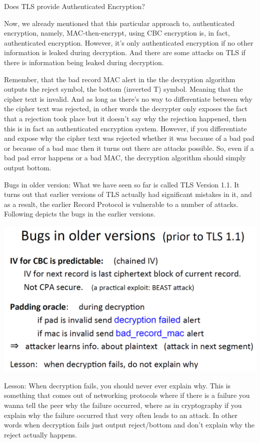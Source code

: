 \documentclass[11pt]{article}
\makeatletter
\def\maxwidth{\ifdim\Gin@nat@width>\linewidth\linewidth
    \else\Gin@nat@width\fi}
\let\Oldincludegraphics\includegraphics
\renewcommand{\includegraphics}[1]{\Oldincludegraphics[width=.8\maxwidth]{#1}}
\makeatother
\begin{document}
Does TLS provide Authenticated Encryption?

Now, we already mentioned that this particular approach to,
authenticated encryption, namely, MAC-then-encrypt, using CBC encryption
is, in fact, authenticated encryption. However, it's only authenticated
encryption if no other information is leaked during decryption. And
there are some attacks on TLS if there is information being leaked
during decryption.

Remember, that the bad record MAC alert in the the decryption algorithm
outputs the reject symbol, the bottom (inverted T) symbol. Meaning that
the cipher text is invalid. And as long as there's no way to
differentiate between why the cipher text was rejected, in other words
the decrypter only exposes the fact that a rejection took place but it
doesn't say why the rejection happened, then this is in fact an
authenticated encryption system. However, if you differentiate and
expose why the cipher text was rejected whether it was because of a bad
pad or because of a bad mac then it turns out there are attacks
possible. So, even if a bad pad error happens or a bad MAC, the
decryption algorithm should simply output bottom.

Bugs in older version: What we have seen so far is called TLS Version
1.1. It turns out that earlier versions of TLS actually had significant
mistakes in it, and as a result, the earlier Record Protocol is
vulnerable to a number of attacks. Following depicts the bugs in the
earlier versions.

\includegraphics{./Images/TLS-BugsinOLDVer.png}

Lesson: When decryption fails, you should never ever explain why. This
is something that comes out of networking protocols where if there is a
failure you wanna tell the peer why the failure occurred, where as in
cryptography if you explain why the failure occurred that very often
leads to an attack. In other words when decryption fails just output
reject/bottom and don't explain why the reject actually happens.
\end{document}
